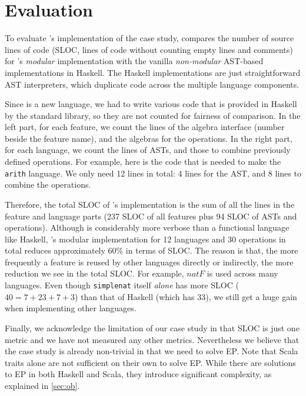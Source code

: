 \section{Evaluation}
\label{sec:evaluate}

To evaluate \sedel's implementation of the case study,
 compares the number of source lines of code
(SLOC, lines of code without counting empty lines and comments) for
\sedel's \emph{modular} implementation with the vanilla
\emph{non-modular} AST-based implementations in Haskell. The Haskell
implementations are just straightforward AST interpreters, which duplicate code across the multiple language
components.

Since \sedel is a new language, we
had to write various code that is provided in Haskell by the standard library,
so they are not counted for fairness of comparison. In the left part, for each
feature, we count the lines of the algebra interface (number beside the feature
name), and the algebras for the operations. In the right part, for each
language, we count the lines of ASTs, and those to combine previously
defined operations. For example, here is the code that is needed to make the
\lstinline{arith} language.
We only need 12 lines in total: 4 lines for the AST, and 8 lines to combine the operations.

Therefore, the total SLOC of \sedel's implementation is the sum of all the
lines in the feature and language parts (237 SLOC of all features plus 94 SLOC
of ASTs and operations). Although \sedel is considerably more verbose than a
functional language like Haskell, \sedel's modular implementation for 12 languages and 30
operations in total reduces approximately 60\% in terms of SLOC. The reason is
that, the more frequently a feature is reused by other languages directly or
indirectly, the more reduction we see in the total SLOC. For example,
$\mathit{natF}$ is used across many languages. Even though \lstinline{simplenat}
itself \emph{alone} has more SLOC ($40 = 7+23+7+3$) than that of Haskell (which
has 33), we still get a huge gain when implementing other languages.

Finally, we acknowledge the limitation of our case study in that SLOC is just
one metric and we have not measured any other metrics. Nevertheless we believe
that the case study is already non-trivial in that we need to solve EP. Note
that Scala traits alone are not sufficient on their own to solve EP. While there
are solutions to EP in both Haskell and Scala, they
introduce significant complexity, as explained in \cref{sec:ob}.



